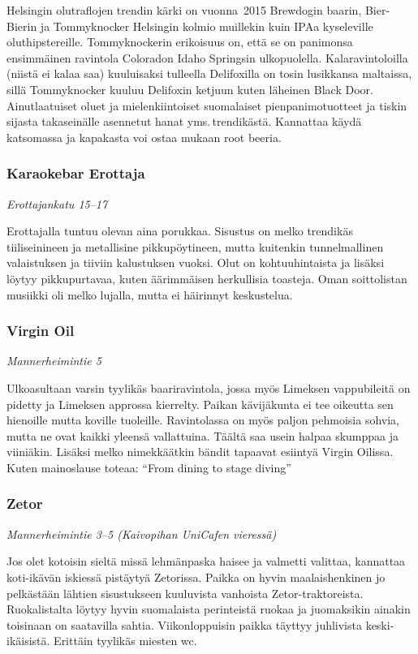 \documentclass[../ala_hataile.tex]{subfiles}
\begin{document}
Helsingin olutraflojen trendin kärki
on vuonna~2015 Brewdogin baarin, Bier-
Bierin ja Tommyknocker Helsingin kolmio
muillekin kuin IPAa kyseleville oluthipstereille.
Tommyknockerin erikoisuus on,
että se on panimonsa ensimmäinen ravintola
Coloradon Idaho Springsin ulkopuolella.
Kalaravintoloilla (niistä ei kalaa saa)
kuuluisaksi tulleella Delifoxilla on tosin
lusikkansa maltaissa, sillä Tommyknocker
kuuluu Delifoxin ketjuun kuten läheinen
Black Door. Ainutlaatuiset oluet ja mielenkiintoiset
suomalaiset pienpanimotuotteet
ja tiskin sijasta takaseinälle asennetut hanat
yms.\,trendikästä. Kannattaa käydä katsomassa
ja kapakasta voi ostaa mukaan root
beeria.
\subsubsection*{Karaokebar Erottaja}
\textit{Erottajankatu 15--17}

Erottajalla tuntuu olevan aina porukkaa.
Sisustus on melko trendikäs tiiliseinineen
ja metallisine pikkupöytineen, mutta
kuitenkin tunnelmallinen valaistuksen ja
tiiviin kalustuksen vuoksi. Olut on kohtuuhintaista
ja lisäksi löytyy pikkupurtavaa,
kuten äärimmäisen herkullisia toasteja.
Oman soittolistan musiikki oli melko lujalla,
mutta ei häirinnyt keskustelua.

\subsubsection*{Virgin Oil}
\textit{Mannerheimintie 5}

Ulkoasultaan varsin tyylikäs baariravintola,
jossa myös Limeksen vappubileitä
on pidetty ja Limeksen approssa kierrelty.
Paikan kävijäkunta ei tee oikeutta sen hienoille
mutta koville tuoleille. Ravintolassa
on myös paljon pehmoisia sohvia, mutta ne
ovat kaikki yleensä vallattuina. Täältä saa
usein halpaa skumppaa ja viiniäkin. Lisäksi
melko nimekkäätkin bändit tapaavat esiintyä
Virgin Oilissa. Kuten mainoslause toteaa:
``From dining to stage diving''
\subsubsection*{Zetor}
\textit{Mannerheimintie 3--5 (Kaivopihan UniCafen vieressä)}

Jos olet kotoisin sieltä missä lehmänpaska
haisee ja valmetti valittaa, kannattaa
koti-ikävän iskiessä pistäytyä Zetorissa.
Paikka on hyvin maalaishenkinen jo pelkästään
lähtien sisustukseen kuuluvista
vanhoista Zetor-traktoreista. Ruokalistalta
löytyy hyvin suomalaista perinteistä ruokaa
ja juomaksikin ainakin toisinaan on saatavilla
sahtia. Viikonloppuisin paikka täyttyy
juhlivista keski-ikäisistä. Erittäin tyylikäs
miesten wc.
\end{document}

